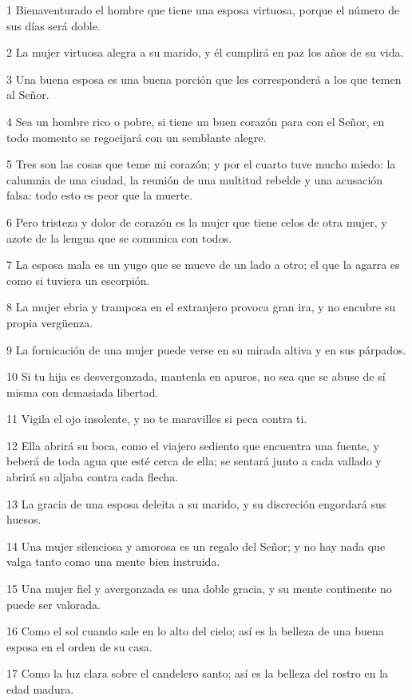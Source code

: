 \par 1 Bienaventurado el hombre que tiene una esposa virtuosa, porque el número de sus días será doble.
\par 2 La mujer virtuosa alegra a su marido, y él cumplirá en paz los años de su vida.
\par 3 Una buena esposa es una buena porción que les corresponderá a los que temen al Señor.
\par 4 Sea un hombre rico o pobre, si tiene un buen corazón para con el Señor, en todo momento se regocijará con un semblante alegre.
\par 5 Tres son las cosas que teme mi corazón; y por el cuarto tuve mucho miedo: la calumnia de una ciudad, la reunión de una multitud rebelde y una acusación falsa: todo esto es peor que la muerte.
\par 6 Pero tristeza y dolor de corazón es la mujer que tiene celos de otra mujer, y azote de la lengua que se comunica con todos.
\par 7 La esposa mala es un yugo que se mueve de un lado a otro; el que la agarra es como si tuviera un escorpión.
\par 8 La mujer ebria y tramposa en el extranjero provoca gran ira, y no encubre su propia vergüenza.
\par 9 La fornicación de una mujer puede verse en su mirada altiva y en sus párpados.
\par 10 Si tu hija es desvergonzada, mantenla en apuros, no sea que se abuse de sí misma con demasiada libertad.
\par 11 Vigila el ojo insolente, y no te maravilles si peca contra ti.
\par 12 Ella abrirá su boca, como el viajero sediento que encuentra una fuente, y beberá de toda agua que esté cerca de ella; se sentará junto a cada vallado y abrirá su aljaba contra cada flecha.
\par 13 La gracia de una esposa deleita a su marido, y su discreción engordará sus huesos.
\par 14 Una mujer silenciosa y amorosa es un regalo del Señor; y no hay nada que valga tanto como una mente bien instruida.
\par 15 Una mujer fiel y avergonzada es una doble gracia, y su mente continente no puede ser valorada.
\par 16 Como el sol cuando sale en lo alto del cielo; así es la belleza de una buena esposa en el orden de su casa.
\par 17 Como la luz clara sobre el candelero santo; así es la belleza del rostro en la edad madura.
